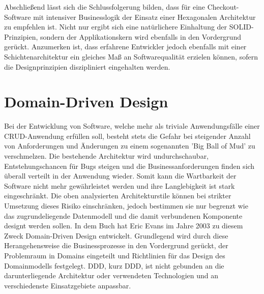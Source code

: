 Abschließend lässt sich die Schlussfolgerung bilden, dass für eine Checkout-Software mit intensiver Businesslogik der Einsatz einer Hexagonalen Architektur zu empfehlen ist. Nicht nur ergibt sich eine natürlichere Einhaltung der SOLID-Prinzipien, sondern der Applikationskern wird ebenfalls in den Vordergrund gerückt. Anzumerken ist, dass erfahrene Entwickler jedoch ebenfalls mit einer Schichtenarchitektur ein gleiches Maß an Softwarequalität erzielen können, sofern die Designprinzipien diszipliniert eingehalten werden. 

\section{Domain-Driven Design}

Bei der Entwicklung von Software, welche mehr als triviale Anwendungsfälle einer CRUD-Anwendung erfüllen soll, besteht stets die Gefahr bei steigender Anzahl von Anforderungen und Änderungen zu einem sogenannten 'Big Ball of Mud' zu verschmelzen. Die bestehende Architektur wird undurchschaubar, Entstehungschancen für Bugs steigen und die Businessanforderungen finden sich überall verteilt in der Anwendung wieder. Somit kann die Wartbarkeit der Software nicht mehr gewährleistet werden und ihre Langlebigkeit ist stark eingeschränkt. Die oben analysierten Architekturstile können bei strikter Umsetzung dieses Risiko einschränken, jedoch bestimmen sie nur begrenzt wie das zugrundeliegende Datenmodell und die damit verbundenen Komponente designt werden sollen. In dem Buch  hat Eric Evans im Jahre 2003 zu diesem Zweck Domain-Driven Design entwickelt. Grundlegend wird durch diese Herangehensweise die Businessprozesse in den Vordergrund gerückt, der Problemraum in Domains eingeteilt und Richtlinien für das Design des Domainmodells festgelegt. \acrlong{DDD}, kurz \acrshort{DDD}, ist nicht gebunden an die darunterliegende Architektur oder verwendeten Technologien und an verschiedenste Einsatzgebiete anpassbar.

